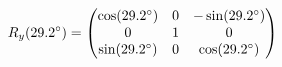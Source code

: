 \documentclass[preview]{standalone}
\begin{document}
\begin{align*}
\special{dvisvgm:raw <g id='unique000'>}R_y(29.2^\circ) = \begin{pmatrix} \cos(29.2^\circ) & 0 & -\sin(29.2^\circ) \\ 0 & 1 & 0 \\ \sin(29.2^\circ) & 0 & \cos(29.2^\circ) \end{pmatrix}\special{dvisvgm:raw </g>}
\end{align*}
\end{document}
